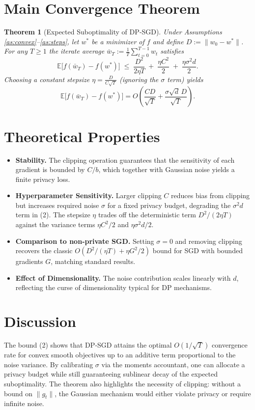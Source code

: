 \documentclass{article}
\newtheorem{theorem}{Theorem}
\newcommand{\EE}{\mathbb{E}}
\begin{document}
\section*{Main Convergence Theorem}
\begin{theorem}[Expected Suboptimality of DP‑SGD]\label{thm:main}
Under Assumptions \ref{as:convex}–\ref{as:steps}, let $w^*$ be a minimizer of $f$ and define $D:=\|w_0-w^*\|$. For any $T\ge1$ the iterate average $\bar w_T:=\frac{1}{T}\sum_{t=0}^{T-1}w_t$ satisfies
\[
\EE\!\big[f(\bar w_T)-f(w^*)\big]\;\le\;
\frac{D^2}{2\eta T}
\;+\;
\frac{\eta C^2}{2}
\;+\;
\frac{\eta\sigma^2 d}{2}.
\tag{2}
\]
Choosing a constant stepsize $\eta=\frac{D}{C\sqrt{T}}$ (ignoring the $\sigma$ term) yields
\[
\EE\!\big[f(\bar w_T)-f(w^*)\big]=O\!\left(\frac{C D}{\sqrt{T}}+\frac{\sigma\sqrt{d}\,D}{\sqrt{T}}\right).
\]
\end{theorem}

\section*{Theoretical Properties}
\begin{itemize}
\item \textbf{Stability.} The clipping operation guarantees that the sensitivity of each gradient is bounded by $C/b$, which together with Gaussian noise yields a finite privacy loss.
\item \textbf{Hyperparameter Sensitivity.} Larger clipping $C$ reduces bias from clipping but increases required noise $\sigma$ for a fixed privacy budget, degrading the $\sigma^2 d$ term in (2). The stepsize $\eta$ trades off the deterministic term $D^2/(2\eta T)$ against the variance terms $\eta C^2/2$ and $\eta\sigma^2 d/2$.
\item \textbf{Comparison to non‑private SGD.} Setting $\sigma=0$ and removing clipping recovers the classic $O(D^2/(\eta T)+\eta G^2/2)$ bound for SGD with bounded gradients $G$, matching standard results.
\item \textbf{Effect of Dimensionality.} The noise contribution scales linearly with $d$, reflecting the curse of dimensionality typical for DP mechanisms.
\end{itemize}

\section*{Discussion}
The bound (2) shows that DP‑SGD attains the optimal $O(1/\sqrt{T})$ convergence rate for convex smooth objectives up to an additive term proportional to the noise variance. By calibrating $\sigma$ via the moments accountant, one can allocate a privacy budget while still guaranteeing sublinear decay of the expected suboptimality. The theorem also highlights the necessity of clipping: without a bound on $\|g_t\|$, the Gaussian mechanism would either violate privacy or require infinite noise.
\end{document}
